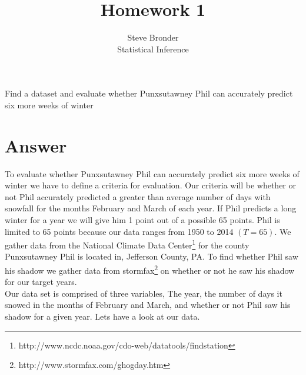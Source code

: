 \documentclass[12pt]{article}\usepackage[]{graphicx}\usepackage[]{color}
\newenvironment{exercise}[2][Exercise]{\begin{trivlist}
\item[\hskip \labelsep {\bfseries #1}\hskip \labelsep {\bfseries #2.}]}{\end{trivlist}}
\begin{document}
 
 
\title{Homework 1}%
\author{Steve Bronder\\ %
Statistical Inference} %
 
\maketitle
 
\begin{exercise}{1}Find a dataset and evaluate whether Punxsutawney Phil can accurately predict six more weeks of winter
\end{exercise}

\section*{Answer}
 To evaluate whether Punxsutawney Phil can accurately predict six more weeks of winter we have to define a criteria for evaluation. Our criteria will be whether or not Phil accurately predicted a greater than average number of days with snowfall for the months February and March of each year. If Phil predicts a long winter for a year we will give him 1 point out of a possible 65 points. Phil is limited to 65 points because our data ranges from 1950 to 2014 $(T=65)$. We gather data from the National Climate Data Center\footnote{http://www.ncdc.noaa.gov/cdo-web/datatools/findstation} for the county Punxsutawney Phil is located in, Jefferson County, PA. To find whether Phil saw his shadow we gather data from stormfax\footnote{http://www.stormfax.com/ghogday.htm} on whether or not he saw his shadow for our target years. \\

 Our data set is comprised of three variables, The year, the number of days it snowed in the months of February and March, and whether or not Phil saw his shadow for a given year. Lets have a look at our data.
 
\end{document}
